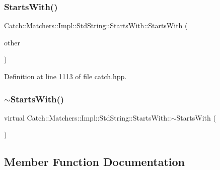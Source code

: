 \subsubsection{\texorpdfstring{Starts\+With()}{StartsWith()}\hspace{0.1cm}{\footnotesize\ttfamily [2/2]}}
{\footnotesize\ttfamily Catch\+::\+Matchers\+::\+Impl\+::\+Std\+String\+::\+Starts\+With\+::\+Starts\+With (\begin{DoxyParamCaption}\item[{\hyperlink{struct_catch_1_1_matchers_1_1_impl_1_1_std_string_1_1_starts_with}{Starts\+With} const \&}]{other }\end{DoxyParamCaption})\hspace{0.3cm}{\ttfamily [inline]}}



Definition at line 1113 of file catch.\+hpp.

\hypertarget{struct_catch_1_1_matchers_1_1_impl_1_1_std_string_1_1_starts_with_ad22a0d01b6c29bd4784ffff988e99992}{}\label{struct_catch_1_1_matchers_1_1_impl_1_1_std_string_1_1_starts_with_ad22a0d01b6c29bd4784ffff988e99992} 
\subsubsection{\texorpdfstring{$\sim$\+Starts\+With()}{~StartsWith()}}
{\footnotesize\ttfamily virtual Catch\+::\+Matchers\+::\+Impl\+::\+Std\+String\+::\+Starts\+With\+::$\sim$\+Starts\+With (\begin{DoxyParamCaption}{ }\end{DoxyParamCaption})\hspace{0.3cm}{\ttfamily [virtual]}}



\subsection{Member Function Documentation}
\hypertarget{struct_catch_1_1_matchers_1_1_impl_1_1_std_string_1_1_starts_with_ab8f8d15e06d7ec13fee7d9ec4075dafa}{}\label{struct_catch_1_1_matchers_1_1_impl_1_1_std_string_1_1_starts_with_ab8f8d15e06d7ec13fee7d9ec4075dafa} 
